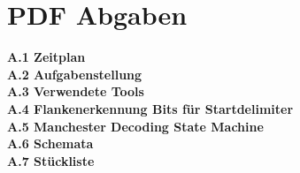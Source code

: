 
\chapter{PDF Abgaben}
\label{AppendixA}

\textbf{A.1 Zeitplan\\
A.2 Aufgabenstellung\\
A.3 Verwendete Tools\\
A.4 Flankenerkennung Bits für Startdelimiter\\
A.5 Manchester Decoding State Machine\\
A.6 Schemata\\
A.7 Stückliste
}




\newpage








%

